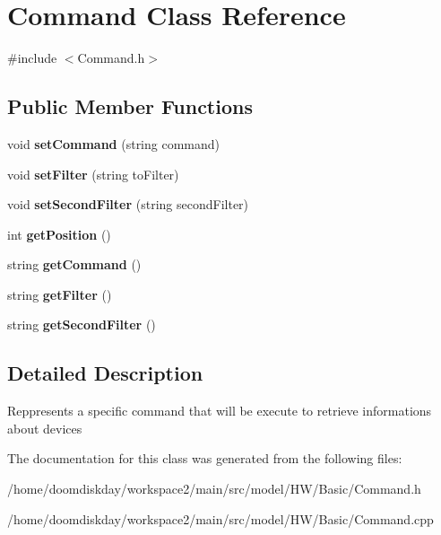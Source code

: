\hypertarget{classCommand}{}\section{Command Class Reference}
\label{classCommand}


{\ttfamily \#include $<$Command.\+h$>$}

\subsection*{Public Member Functions}
\begin{DoxyCompactItemize}
\item 
void {\bfseries set\+Command} (string command)\hypertarget{classCommand_a5939caf9002688381de327a19b7cafae}{}\label{classCommand_a5939caf9002688381de327a19b7cafae}

\item 
void {\bfseries set\+Filter} (string to\+Filter)\hypertarget{classCommand_acf26ff1c38e38207e1522b2d49f0a8b8}{}\label{classCommand_acf26ff1c38e38207e1522b2d49f0a8b8}

\item 
void {\bfseries set\+Second\+Filter} (string second\+Filter)\hypertarget{classCommand_a615bf229502f06c0d5b1a64df7dd1e9c}{}\label{classCommand_a615bf229502f06c0d5b1a64df7dd1e9c}

\item 
int {\bfseries get\+Position} ()\hypertarget{classCommand_ab2573831d9864c076816590bc5a2eb3c}{}\label{classCommand_ab2573831d9864c076816590bc5a2eb3c}

\item 
string {\bfseries get\+Command} ()\hypertarget{classCommand_abdd31f136459c4aeaabcac39ec21bbf1}{}\label{classCommand_abdd31f136459c4aeaabcac39ec21bbf1}

\item 
string {\bfseries get\+Filter} ()\hypertarget{classCommand_a68ab7852a1c55af383220142efce25f3}{}\label{classCommand_a68ab7852a1c55af383220142efce25f3}

\item 
string {\bfseries get\+Second\+Filter} ()\hypertarget{classCommand_a4dedeb327ba2b4439b670d08afdb1286}{}\label{classCommand_a4dedeb327ba2b4439b670d08afdb1286}

\end{DoxyCompactItemize}


\subsection{Detailed Description}
Reppresents a specific command that will be execute to retrieve informations about devices 

The documentation for this class was generated from the following files\+:\begin{DoxyCompactItemize}
\item 
/home/doomdiskday/workspace2/main/src/model/\+H\+W/\+Basic/Command.\+h\item 
/home/doomdiskday/workspace2/main/src/model/\+H\+W/\+Basic/Command.\+cpp\end{DoxyCompactItemize}
